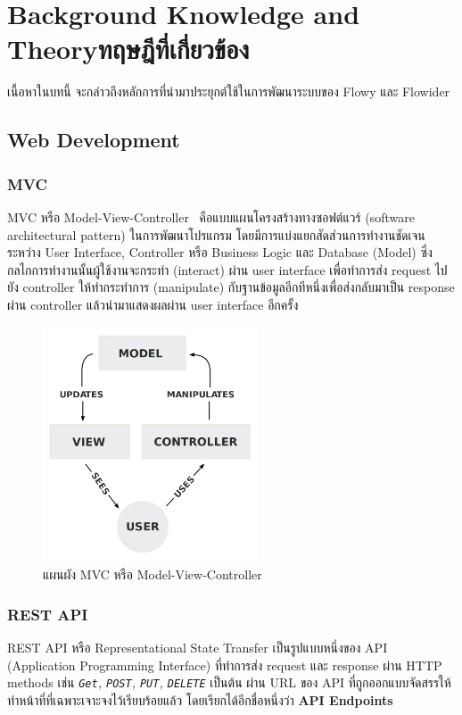 \chapter{\ifenglish Background Knowledge and Theory\else ทฤษฎีที่เกี่ยวข้อง\fi}

เนื้อหาในบทนี้ จะกล่าวถึงหลักการที่นำมาประยุกต์ใช้ในการพัฒนาระบบของ Flowy และ Flowider

\section{Web Development}
\subsection{MVC}
MVC หรือ Model-View-Controller~\cite{concept_mvc} คือแบบแผนโครงสร้างทางซอฟต์แวร์ (software architectural pattern) ในการพัฒนาโปรแกรม โดยมีการแบ่งแยกสัดส่วนการทำงานชัดเจนระหว่าง User Interface, Controller หรือ Business Logic และ Database (Model) ซึ่งกลไกการทำงานนั้นผู้ใช้งานจะกระทำ (interact) ผ่าน user interface เพื่อทำการส่ง request ไปยัง controller ให้ทำกระทำการ (manipulate) กับฐานข้อมูลอีกทีหนึ่งเพื่อส่งกลับมาเป็น response ผ่าน controller แล้วนำมาแสดงผลผ่าน user interface อีกครั้ง
\begin{figure}[h]
  \begin{center}
  \includegraphics[width=2.5in]{./image/MVC.png}
  \end{center}
  \caption[MVC]{แผนผัง MVC หรือ Model-View-Controller~\cite{mvc}}
  \label{fig:MVC}
\end{figure}

\subsection{REST API}
REST API หรือ Representational State Transfer เป็นรูปแบบหนึ่งของ API (Application Programming Interface) ที่ทำการส่ง request และ response ผ่าน HTTP methods เช่น \textit{\texttt{Get}, \texttt{POST}, \texttt{PUT}, \texttt{DELETE}} เป็นต้น ผ่าน URL ของ API ที่ถูกออกแบบจัดสรรให้ทำหน้าที่ที่เฉพาะเจาะจงไว้เรียบร้อยแล้ว โดยเรียกได้อีกชื่อหนึ่งว่า \textbf{API Endpoints}

